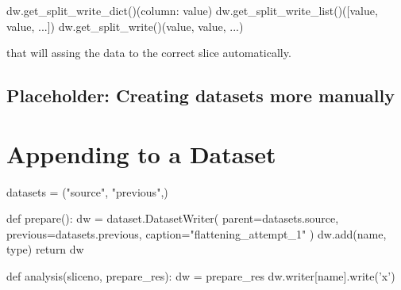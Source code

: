 \begin{python}
  dw.get_split_write_dict()({column: value})
  dw.get_split_write_list()([value, value, ...])
  dw.get_split_write()(value, value, ...)
\end{python}
that will assing the data to the correct slice automatically.

\subsection{Placeholder:  Creating datasets more manually}


\section{Appending to a Dataset}
\begin{python}
datasets = ("source", "previous",)

def prepare():
  dw = dataset.DatasetWriter(
    parent=datasets.source,
    previous=datasets.previous,
    caption="flattening_attempt_1"
  )
  dw.add(name, type)
  return dw

def analysis(sliceno, prepare_res):
  dw = prepare_res
  dw.writer[name].write('x')
\end{python}



  
